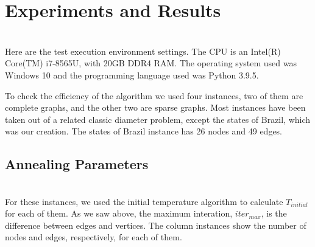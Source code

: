 \documentclass[12pt]{article}
\begin{document}


\section{Experiments and Results}\\

Here are the test execution environment settings. The CPU is an Intel(R) Core(TM) i7-8565U, with 20GB DDR4 RAM. The operating system used was Windows 10 and the programming language used was Python 3.9.5.

To check the efficiency of the algorithm we used four instances, two of them are complete graphs, and the other two are sparse graphs. Most instances have been taken out of a related classic diameter problem, except the states of Brazil, which was our creation. The states of Brazil instance has 26 nodes and 49 edges. 

\subsection{Annealing Parameters}\\

For these instances, we used the initial temperature algorithm to calculate $T_{initial}$ for each of them. As we saw above, the maximum interation, $iter_{max}$, is the difference between edges and vertices. The column instances show the number of nodes and edges, respectively, for each of them.
\end{document}

